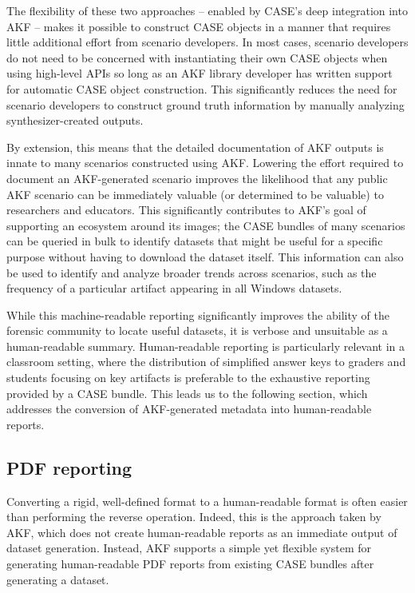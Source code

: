 \documentclass[final,5p,times,twocolumn]{elsarticle}
\begin{document}
The flexibility of these two approaches -- enabled by CASE's deep
integration into AKF -- makes it possible to construct CASE objects in a
manner that requires little additional effort from scenario developers.
In most cases, scenario developers do not need to be concerned with
instantiating their own CASE objects when using high-level APIs so long
as an AKF library developer has written support for automatic CASE
object construction. This significantly reduces the need for scenario
developers to construct ground truth information by manually analyzing
synthesizer-created outputs.

By extension, this means that the detailed documentation of AKF outputs
is innate to many scenarios constructed using AKF. Lowering the effort
required to document an AKF-generated scenario improves the likelihood
that any public AKF scenario can be immediately valuable (or determined
to be valuable) to researchers and educators. This significantly
contributes to AKF's goal of supporting an ecosystem around its images;
the CASE bundles of many scenarios can be queried in bulk to identify
datasets that might be useful for a specific purpose without having to
download the dataset itself. This information can also be used to
identify and analyze broader trends across scenarios, such as the
frequency of a particular artifact appearing in all Windows datasets.

While this machine-readable reporting significantly improves the ability
of the forensic community to locate useful datasets, it is verbose and
unsuitable as a human-readable summary. Human-readable reporting is
particularly relevant in a classroom setting, where the distribution of
simplified answer keys to graders and students focusing on key artifacts
is preferable to the exhaustive reporting provided by a CASE bundle.
This leads us to the following section, which addresses the conversion
of AKF-generated metadata into human-readable reports.

\subsection{PDF reporting}\label{pdf-reporting}

Converting a rigid, well-defined format to a human-readable format is
often easier than performing the reverse operation. Indeed, this is the
approach taken by AKF, which does not create human-readable reports as
an immediate output of dataset generation. Instead, AKF supports a
simple yet flexible system for generating human-readable PDF reports
from existing CASE bundles after generating a dataset.
\end{document}
